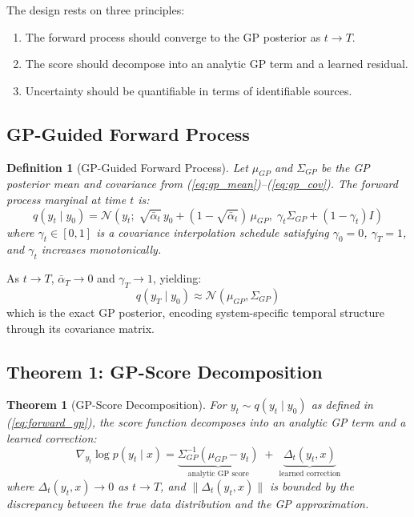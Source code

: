 \documentclass[conference]{IEEEtran}
\newtheorem{theorem}{Theorem}
\newtheorem{definition}{Definition}
\begin{document}
The design rests on three principles:
\begin{enumerate}
    \item The forward process should converge to the GP posterior as $t \to T$.
    \item The score should decompose into an analytic GP term and a learned residual.
    \item Uncertainty should be quantifiable in terms of identifiable sources.
\end{enumerate}

\subsection{GP-Guided Forward Process}

\begin{definition}[GP-Guided Forward Process]
Let $\mu_{GP}$ and $\Sigma_{GP}$ be the GP posterior mean and covariance from (\ref{eq:gp_mean})--(\ref{eq:gp_cov}). The forward process marginal at time $t$ is:
\begin{equation}
q(y_t \mid y_0) = \mathcal{N}\left(y_t;\; \sqrt{\bar{\alpha}_t}\, y_0 + (1 - \sqrt{\bar{\alpha}_t})\, \mu_{GP},\; \gamma_t \Sigma_{GP} + (1 - \gamma_t) I \right) \label{eq:forward_gp}
\end{equation}
where $\gamma_t \in [0,1]$ is a covariance interpolation schedule satisfying $\gamma_0 = 0$, $\gamma_T = 1$, and $\gamma_t$ increases monotonically.
\end{definition}

As $t \to T$, $\bar{\alpha}_T \to 0$ and $\gamma_T \to 1$, yielding:
\begin{equation}
q(y_T \mid y_0) \approx \mathcal{N}(\mu_{GP}, \Sigma_{GP})
\end{equation}
which is the exact GP posterior, encoding system-specific temporal structure through its covariance matrix.

\subsection{Theorem 1: GP-Score Decomposition}

\begin{theorem}[GP-Score Decomposition]
\label{thm:score}
For $y_t \sim q(y_t \mid y_0)$ as defined in (\ref{eq:forward_gp}), the score function decomposes into an analytic GP term and a learned correction:
\begin{equation}
\boxed{\nabla_{y_t} \log p(y_t \mid x) = \underbrace{\Sigma_{GP}^{-1}(\mu_{GP} - y_t)}_{\text{analytic GP score}} \;+\; \underbrace{\Delta_t(y_t, x)}_{\text{learned correction}}} \label{eq:score_decomp}
\end{equation}
where $\Delta_t(y_t, x) \to 0$ as $t \to T$, and $\|\Delta_t(y_t, x)\|$ is bounded by the discrepancy between the true data distribution and the GP approximation.
\end{theorem}
\end{document}
